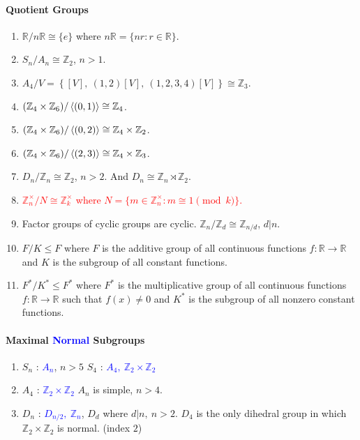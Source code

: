 \paragraph{Quotient Groups}
\begin{enumerate}
	\item $\mathbb{R}/n\mathbb{R} \cong \{ e \}$ where $n\mathbb{R} = \{ nr : r \in \mathbb{R} \}$.
	\item $S_n/A_n \cong \mathbb{Z}_2$, $n>1$.
	\item $A_4/V  = \left\{ [V],\ (1,2)[V],\ (1,2,3,4)[V] \right\} \cong \mathbb{Z}_3$.
	\item $(\mathbb{Z}_4 \times \mathbb{Z}_6)/\left\langle (0,1) \right\rangle \cong \mathbb{Z}_4$.
	\item $(\mathbb{Z}_4 \times \mathbb{Z}_6)/\left\langle (0,2) \right\rangle \cong \mathbb{Z}_4 \times \mathbb{Z}_2$.
	\item $(\mathbb{Z}_4 \times \mathbb{Z}_6)/\left\langle (2,3) \right\rangle \cong \mathbb{Z}_4 \times \mathbb{Z}_3$.
	\item $D_n/\mathbb{Z}_n \cong \mathbb{Z}_2$, $n>2$. And $D_n \cong \mathbb{Z}_n \rtimes \mathbb{Z}_2$.
	\item \textcolor{red}{$\mathbb{Z}_n^\times/N \cong \mathbb{Z}_k^\times$ where $N = \{ m \in \mathbb{Z}_n^\times : m \cong 1 \pmod{k} \}$.}
	\item Factor groups of cyclic groups are cyclic. $\mathbb{Z}_n/\mathbb{Z}_d \cong \mathbb{Z}_{n/d}$, $d|n$.
	\item $F/K \le F$ where $F$ is the additive group of all continuous functions $f : \mathbb{R} \to \mathbb{R}$ and $K$ is the subgroup of all constant functions.
	\item $F^\ast/K^\ast \le F^\ast$ where $F^\ast$ is the multiplicative group of all continuous functions $f : \mathbb{R} \to \mathbb{R}$ such that $f(x) \ne 0$ and $K^\ast$ is the subgroup of all nonzero constant functions.
\end{enumerate}

\paragraph{Maximal \textcolor{blue}{Normal} Subgroups}
\begin{enumerate}
	\item $S_n$ : \textcolor{blue}{$A_n$}, $n > 5$
		\subitem $S_4$ : \textcolor{blue}{$A_4,\ \mathbb{Z}_2 \times \mathbb{Z}_2$}
	\item $A_4$ : \textcolor{blue}{$\mathbb{Z}_2 \times \mathbb{Z}_2$}
		\subitem $A_n$ is simple, $n > 4$.
	\item $D_n$ : \textcolor{blue}{$D_{n/2},\ \mathbb{Z}_n$}, $D_d$ where $d|n,\ n>2$.
		\subitem $D_4$ is the only dihedral group in which $\mathbb{Z}_2 \times \mathbb{Z}_2$ is normal. (index $2$)
\end{enumerate}


